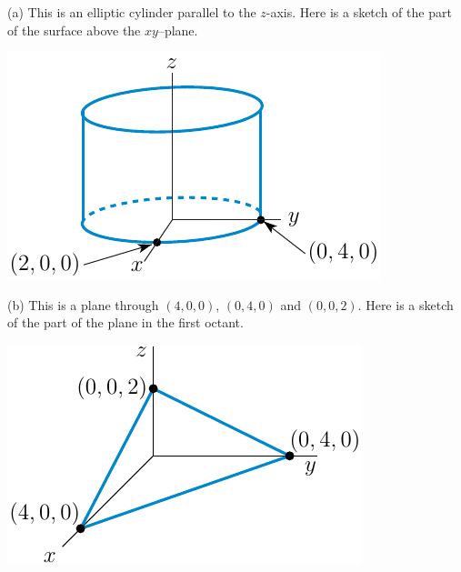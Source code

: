 %

\begin{answer}
(a) This is an elliptic cylinder parallel to the $z$-axis.
Here is a sketch of the part of the surface above the $xy$--plane.
\begin{center}
     \includegraphics{fig/elliptical_cylinder}
\end{center}

(b)
This is a plane through $(4,0,0)$, $(0,4,0)$ and $(0,0,2)$.
Here is a sketch of the part of the plane in the first octant.
\begin{center}
     \includegraphics{fig/plane.pdf}
\end{center}


\end{answer}
